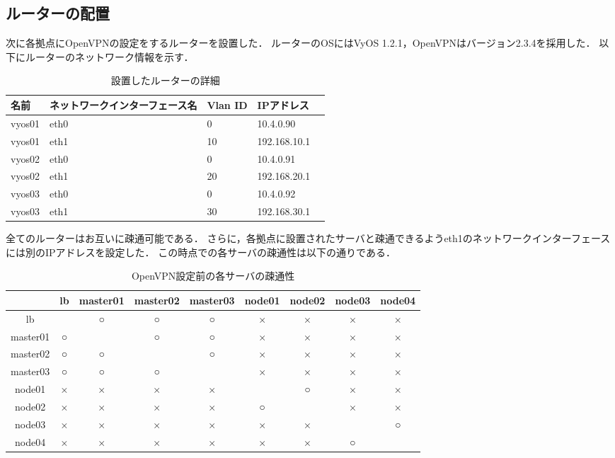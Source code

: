 \subsection{ルーターの配置}

次に各拠点にOpenVPNの設定をするルーターを設置した．
ルーターのOSにはVyOS 1.2.1，OpenVPNはバージョン2.3.4を採用した．
以下にルーターのネットワーク情報を示す．

\begin{table}[htb]
  \begin{center}
    \caption{設置したルーターの詳細}
    \begin{tabular}{|l|l|l|l|l|} \hline
      名前 & ネットワークインターフェース名 & Vlan ID & IPアドレス \\ \hline
      vyos01 & eth0 & 0 & 10.4.0.90 \\ \hline
      vyos01 & eth1 & 10 & 192.168.10.1 \\ \hline
      vyos02 & eth0 & 0 & 10.4.0.91 \\ \hline
      vyos02 & eth1 & 20 & 192.168.20.1 \\ \hline
      vyos03 & eth0 & 0 & 10.4.0.92 \\ \hline
      vyos03 & eth1 & 30 & 192.168.30.1 \\ \hline
    \end{tabular}
  \end{center}
\end{table}

全てのルーターはお互いに疎通可能である．
さらに，各拠点に設置されたサーバと疎通できるようeth1のネットワークインターフェースには別のIPアドレスを設定した．
この時点での各サーバの疎通性は以下の通りである．

\begin{table}[htb]
  \begin{center}
    \caption{OpenVPN設定前の各サーバの疎通性}
    \begin{tabular}{|c|c|c|c|c|c|c|c|c|} \hline
      & lb & master01 & master02 & master03 & node01 & node02 & node03 & node04 \\ \hline
      lb & \ & ○ & ○ & ○ & × & × & × & × \\ \hline
      master01 & ○ & \ & ○ & ○ & × & × & × & × \\ \hline
      master02 & ○ & ○ & \ & ○ & × & × & × & × \\ \hline
      master03 & ○ & ○ & ○ & \ & × & × & × & × \\ \hline
      node01 & × & × & × & × & \ & ○ & × & × \\ \hline
      node02 & × & × & × & × & ○ & \ & × & × \\ \hline
      node03 & × & × & × & × & × & × & \ & ○ \\ \hline
      node04 & × & × & × & × & × & × & ○ & \ \\ \hline
    \end{tabular}
  \end{center}
\end{table}
\label{tb:before-openvpn}

